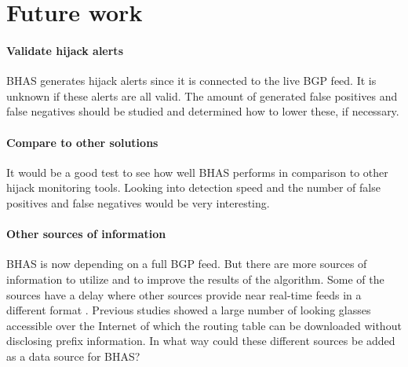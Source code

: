 \section{Future work}\label{ch:futurework}
\paragraph{Validate hijack alerts}\label{par:validatehijackalerts}
BHAS generates hijack alerts since it is connected to the live BGP feed. It is unknown if these alerts are all valid. The amount of generated false positives and false negatives should be studied and determined how to lower these, if necessary. 

\paragraph{Compare to other solutions}\label{par:comapreother}
It would be a good test to see how well BHAS performs in comparison to other hijack monitoring tools. Looking into detection speed and the number of false positives and false negatives would be very interesting.

\paragraph{Other sources of information}\label{par:falsepositive}
BHAS is now depending on a full BGP feed. But there are more sources of information to utilize and to improve the results of the algorithm. Some of the sources have a delay \cite{routeviews} where other sources provide near real-time feeds in a different format \cite{bgpmonio}. Previous studies showed a large number of looking glasses accessible over the Internet of which the routing table can be downloaded without disclosing prefix information. In what way could these different sources be added as a data source for BHAS?  
